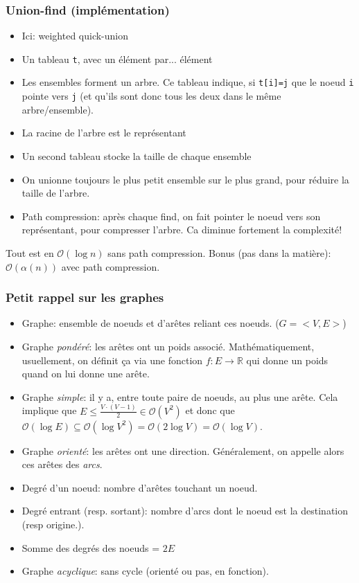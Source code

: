 \documentclass[8pt,aspectratio=169]{beamer}
\begin{document}
\begin{frame}
\frametitle{Union-find (implémentation)}
\begin{itemize}
	\item Ici: weighted quick-union
	\item Un tableau \texttt{t}, avec un élément par... élément
	\item Les ensembles forment un arbre. Ce tableau indique, si \texttt{t[i]=j} que le noeud \texttt{i} pointe vers \texttt{j} (et qu'ils sont donc tous les deux dans le même arbre/ensemble).
	\item La racine de l'arbre est le représentant
	\item Un second tableau stocke la taille de chaque ensemble
	\item On unionne toujours le plus petit ensemble sur le plus grand, pour réduire la taille de l'arbre.
	\item Path compression: après chaque find, on fait pointer le noeud vers son représentant, pour compresser l'arbre. Ca diminue fortement la complexité!
\end{itemize}
Tout est en $\mathcal{O}(\log n)$ sans path compression. Bonus (pas dans la matière): $\mathcal{O}(\alpha(n))$ avec path compression. 
\end{frame}

\begin{frame}
\frametitle{Petit rappel sur les graphes}
\begin{itemize}
	\item Graphe: ensemble de noeuds et d'arêtes reliant ces noeuds. ($G=<V,E>$)
	\item Graphe \textit{pondéré}: les arêtes ont un poids associé. Mathématiquement, usuellement, on définit ça via une fonction $f: E \rightarrow \mathbb{R}$ qui donne un poids quand on lui donne une arête.
	\item Graphe \textit{simple}: il y a, entre toute paire de noeuds, au plus une arête. Cela implique que $E \leq \frac{V\cdot(V-1)}{2} \in \mathcal{O}(V^2)$ et donc que $\mathcal{O}(\log E) \subseteq \mathcal{O}(\log V^2) = \mathcal{O}(2 \log V) = \mathcal{O}(\log V)$.
	\item Graphe \textit{orienté}: les arêtes ont une direction. Généralement, on appelle alors ces arêtes des \textit{arcs}.
	\item Degré d'un noeud: nombre d'arêtes touchant un noeud.
	\item Degré entrant (resp. sortant): nombre d'arcs dont le noeud est la destination (resp origine.).
	\item Somme des degrés des noeuds = $2E$
	\item Graphe \textit{acyclique}: sans cycle (orienté ou pas, en fonction).
\end{itemize}
\end{frame}
\end{document}
